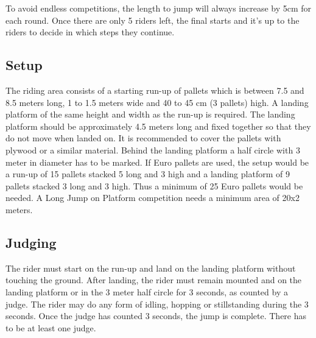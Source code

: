To avoid endless competitions, the length to jump will always increase by 5cm for each round.
Once there are only 5 riders left, the final starts and it’s up to the riders to decide in which steps they continue. 

\subsection{Setup}
The riding area consists of a starting run-up of pallets which is between 7.5 and 8.5 meters long, 1 to 1.5 meters wide and 40 to 45 cm (3 pallets) high.
A landing platform of the same height and width as the run-up is required.
The landing platform should be approximately 4.5 meters long and fixed together so that they do not move when landed on.
It is recommended to cover the pallets with plywood or a similar material.
Behind the landing platform a half circle with 3 meter in diameter has to be marked.
If Euro pallets are used, the setup would be a run-up of 15 pallets stacked 5 long and 3 high and a landing platform of 9 pallets stacked 3 long and 3 high.
Thus a minimum of 25 Euro pallets would be needed.
A Long Jump on Platform competition needs a minimum area of 20x2 meters.

\subsection{Judging}
The rider must start on the run-up and land on the landing platform without touching the ground.
After landing, the rider must remain mounted and on the landing platform or in the 3 meter half circle for 3 seconds, as counted by a judge.
The rider may do any form of idling, hopping or stillstanding during the 3 seconds.
Once the judge has counted 3 seconds, the jump is complete.
There has to be at least one judge.
